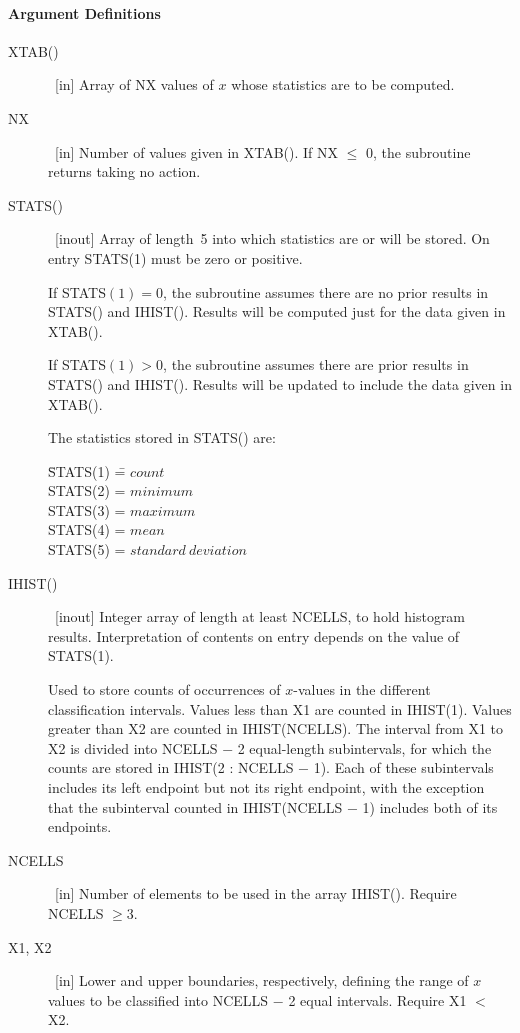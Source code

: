 \documentclass[twoside]{MATH77}
\begin{document}
\paragraph{Argument Definitions}

\begin{description}
\item[XTAB()]  \ [in] Array of NX values of $x$ whose statistics are to be
computed.

\item[NX]  \ [in] Number of values given in XTAB(). If NX $\leq $ 0, the
subroutine returns taking no action.

\item[STATS()]  \ [inout] Array of length~5 into which statistics are or
will be stored. On entry STATS(1) must be zero or positive.

If STATS$(1)=0$, the subroutine assumes there are no prior results in
STATS() and IHIST(). Results will be computed just for the data given in
XTAB().

If STATS$(1)>0$, the subroutine assumes there are prior results in STATS()
and IHIST(). Results will be updated to include the data given in XTAB().

The statistics stored in STATS() are:

\begin{tabbing}
\hspace{.5in}\= STATS(1) \== $count$\\
\>STATS(2) \>= $minimum$\\
\>STATS(3) \>= $maximum$\\
\>STATS(4) \>= $mean$\\
\>STATS(5) \>= $standard\ deviation$
\end{tabbing}

\item[IHIST()]  \ [inout] Integer array of length at least NCELLS, to hold
histogram results. Interpretation of contents on entry depends on the value
of STATS(1).

Used to store counts of occurrences of $x$-values in the different
classification intervals. Values less than X1 are counted in IHIST(1).
Values greater than X2 are counted in IHIST(NCELLS). The interval from X1 to
X2 is divided into NCELLS $-$ 2 equal-length subintervals, for which the
counts are stored in IHIST(2 : NCELLS $-$ 1).  Each of these subintervals
includes its left endpoint but not its right endpoint, with the exception that
the subinterval counted in IHIST(NCELLS $-$ 1) includes both of its endpoints.

\item[NCELLS]  \ [in] Number of elements to be used in the array IHIST().
Require NCELLS $\geq 3.$

\item[X1, X2]  \ [in] Lower and upper boundaries, respectively, defining the
range of $x$ values to be classified into NCELLS $-$ 2 equal intervals. Require
X1 $<$ X2.
\end{description}
\end{document}
